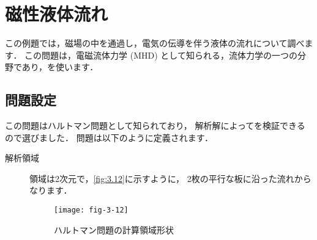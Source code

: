 \section{磁性液体流れ}
\label{sec:3.5}
この例題では，磁場の中を通過し，電気の伝導を伴う液体の流れについて調べます．
この問題は，電磁流体力学 (MHD) として知られる，流体力学の一つの分野であり，を使います．


\subsection{問題設定}
\label{ssec:3.5.1}
この問題はハルトマン問題として知られており，
解析解によってを検証できるので選びました．
問題は以下のように定義されます．
\begin{description}
 \item[解析領域] 領域は2次元で，\autoref{fig:3.12}に示すように，
            2枚の平行な板に沿った流れからなります．


\begin{figure}[ht]
 \texttt{[image: fig-3-12]}
 \caption{ハルトマン問題の計算領域形状}
 \label{fig:3.12}
\end{figure}



\end{description}
